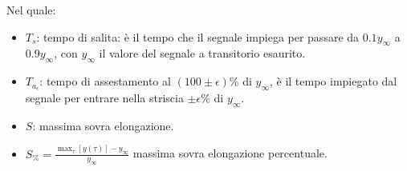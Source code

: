 	Nel quale:
	\begin{itemize}
		\item $ T_s $: tempo di salita: è il tempo che il segnale impiega per passare da $ 0.1y_{\infty} $ a $ 0.9y_{\infty} $, con $ y_{\infty} $ il valore del segnale a transitorio esaurito.
		\item $ T_{a_{\epsilon}} $: tempo di assestamento al $ (100\pm\epsilon)\% $ di $ y_\infty $, è il tempo impiegato dal segnale per entrare nella striscia $ \pm\epsilon\% $ di $ y_\infty $.
		\item $ S $: massima sovra elongazione.
		\item $ S_\% =\frac{ \displaystyle\max_\tau \left[ y (\tau)\right] - y_\infty }{ y_\infty }$ massima sovra elongazione percentuale. 
	\end{itemize}
